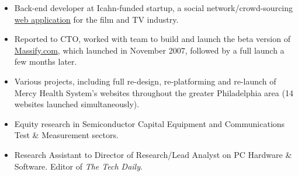 \documentclass[a4paper,10pt]{memoir} %
\begin{document}

\begin{itemize}
	\item Back-end developer at Icahn-funded startup, a social network/crowd-sourcing \href{https://www.nytimes.com/2008/03/10/business/media/10massify.html}{web application} for the film and TV industry.
	\item Reported to CTO, worked with team to build and launch the beta version of \href{https://www.massify.com}{Massify.com}, which launched in November 2007, followed by a full launch a few months later. 
\end{itemize}
\Sep %

\begin{itemize}
	\item Various projects, including full re-design, re-platforming and re-launch of Mercy Health System's websites throughout the greater Philadelphia area (14 websites launched simultaneously). 
\end{itemize}
\Sep %



\begin{itemize}
	\item Equity research in Semiconductor Capital Equipment and Communications Test \& Measurement sectors.
\end{itemize}
\Sep %

\begin{itemize}
	\item Research Assistant to Director of Research/Lead Analyst on PC Hardware \& Software. Editor of \textit{The Tech Daily}.
\end{itemize}

\Sep %

\end{document}

